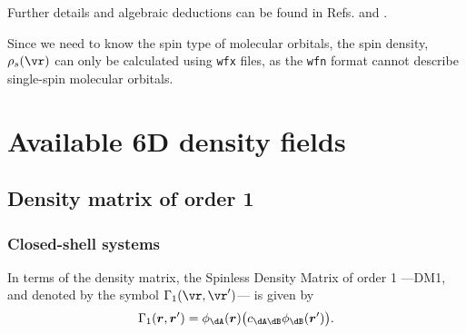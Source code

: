 Further details and algebraic deductions can be found in Refs. \cite{bib:parr1989}
and \cite{bib:andresbeltran2000}.

Since we need to know the spin type of molecular orbitals, the spin density, $\rho_s(\vr)$
can only be calculated using \texttt{wfx} files, as the \texttt{wfn} format cannot
describe single-spin molecular orbitals.


\chapter{Available 6D density fields}\label{sec:availablefields}


\section{Density matrix of order 1}

\subsection{Closed-shell systems}

In terms of the density matrix, the Spinless Density Matrix of order 1
---DM1, and denoted by the symbol $\Gamma_1(\vr,\vr')$--- is given by
%
\begin{equation}
   \Gamma_1(\boldsymbol{r},\boldsymbol{r}')=\phi_{\dA}(\boldsymbol{r})
   \big(c_{\dA\dB}\phi_{\dB}(\boldsymbol{r}')\big).
\end{equation}
%

